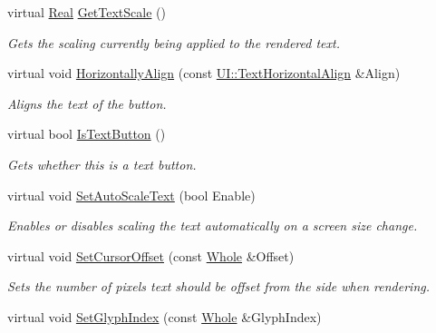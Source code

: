 \begin{DoxyCompactItemize}
virtual \hyperlink{namespaceMezzanine_a726731b1a7df72bf3583e4a97282c6f6}{Real} \hyperlink{classMezzanine_1_1UI_1_1TextButton_a77298d3cf8be433b010a000ae49961a2}{GetTextScale} ()
\begin{DoxyCompactList}\small\item\em Gets the scaling currently being applied to the rendered text. \item\end{DoxyCompactList}\item 
virtual void \hyperlink{classMezzanine_1_1UI_1_1TextButton_a8bcaeb3e5d43fe6f180fa425c7d51384}{HorizontallyAlign} (const \hyperlink{namespaceMezzanine_1_1UI_aebbd46e62bb20d958f1915c1ec6cc549}{UI::TextHorizontalAlign} \&Align)
\begin{DoxyCompactList}\small\item\em Aligns the text of the button. \item\end{DoxyCompactList}\item 
virtual bool \hyperlink{classMezzanine_1_1UI_1_1TextButton_ad4cab393b8c00c43c1b8bfb878c73073}{IsTextButton} ()
\begin{DoxyCompactList}\small\item\em Gets whether this is a text button. \item\end{DoxyCompactList}\item 
virtual void \hyperlink{classMezzanine_1_1UI_1_1TextButton_a80e8ce555469e1f5f5c2fd6134571a40}{SetAutoScaleText} (bool Enable)
\begin{DoxyCompactList}\small\item\em Enables or disables scaling the text automatically on a screen size change. \item\end{DoxyCompactList}\item 
virtual void \hyperlink{classMezzanine_1_1UI_1_1TextButton_ad71905b07ce3f6eac1236d3906a936f9}{SetCursorOffset} (const \hyperlink{namespaceMezzanine_adcbb6ce6d1eb4379d109e51171e2e493}{Whole} \&Offset)
\begin{DoxyCompactList}\small\item\em Sets the number of pixels text should be offset from the side when rendering. \item\end{DoxyCompactList}\item 
virtual void \hyperlink{classMezzanine_1_1UI_1_1TextButton_ab81057cd97a96390ae23c12cc729a07b}{SetGlyphIndex} (const \hyperlink{namespaceMezzanine_adcbb6ce6d1eb4379d109e51171e2e493}{Whole} \&GlyphIndex)

\end{DoxyCompactItemize}
